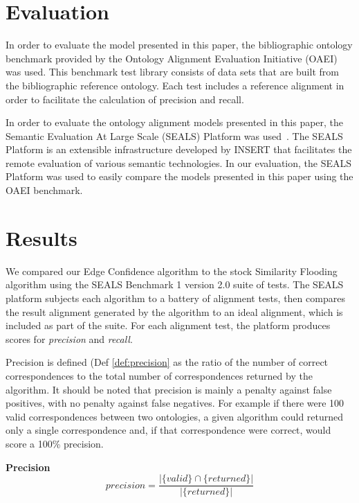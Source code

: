 \documentclass[letterpaper,twocolumn,12pt]{article}
\begin{document}
\section{Evaluation}
\label{sec:eval}

In order to evaluate the model presented in this paper, the bibliographic ontology benchmark provided by the Ontology Alignment Evaluation Initiative (OAEI) was used.
This benchmark test library consists of data sets that are built from the bibliographic reference ontology.
Each test includes a reference alignment in order to facilitate the calculation of precision and recall.

In order to evaluate the ontology alignment models presented in this paper, the Semantic Evaluation At Large Scale (SEALS) Platform was used~\cite{esteban:2010:executing, wrigley:2010:evaluating}.
The SEALS Platform is an extensible infrastructure developed by INSERT that facilitates the remote evaluation of various semantic technologies.
In our evaluation, the SEALS Platform was used to easily compare the models presented in this paper using the OAEI benchmark.

\section{Results}
\label{sec:results}
We compared our Edge Confidence algorithm to the stock Similarity Flooding algorithm using the SEALS Benchmark 1 version 2.0 suite of tests. 
The SEALS platform subjects each algorithm to a battery of alignment tests, then compares the result alignment generated by the algorithm to an ideal alignment, which is included as part of the suite.
For each alignment test, the platform produces scores for \textit{precision} and \textit{recall}.

Precision is defined (Def \ref{def:precision} as the ratio of the number of correct correspondences to the total number of correspondences returned by the algorithm. It should be noted that precision is mainly a penalty against false positives, with no penalty against false negatives. 
For example if there were 100 valid correspondences between two ontologies, a given algorithm could returned only a single correspondence and, if that correspondence were correct, would score a 100\% precision. 

\begin{defn}
\textbf{Precision}
\label{def:precision}
$$
	precision = \frac{|\{valid \} \cap  \{returned \}|}{|\{returned \}|}
$$
\end{defn}
\end{document}
